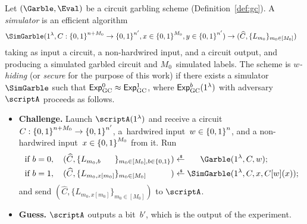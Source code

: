 \begin{definition}\label{def:gc-security}
Let $(\Garble,\Eval)$ be a circuit garbling scheme (Definition~\ref{def:gc}).
A \emph{simulator} is an efficient algorithm
\begin{align*}
\SimGarble&(1^\lambda,C:\bit^{n+M_0}\to\bit^{n'},x\in\bit^{M_0},y\in\bit^{n'})
\WideNarrow{\to}{\\{}\to{}&}
(\widehat{C},\{L_{m_0}\}_{m_0\in[M_0]})
\end{align*}
taking as input a circuit, a non-hardwired input, and a circuit output,
and producing a simulated garbled circuit and $M_0$~simulated labels.
The scheme is \emph{$w$-hiding} (or \emph{secure} for the purpose of this work) if there exists a simulator $\SimGarble$ such that ${\ExpGC{0}\approx\ExpGC{1}}$, where $\ExpGC{b}(1^\lambda)$ with adversary~$\scriptA$ proceeds as follows.
\begin{itemize}\upshape
\item\textbf{Challenge.}
Launch $\scriptA(1^\lambda)$ and receive
a circuit ${C:{\{0,1\}}^{n+M_0}\to{\{0,1\}}^{n'}}$,
a~hardwired input~${w\in{\{0,1\}}^n}$, and
a non-hardwired input~${x\in{\{0,1\}}^{M_0}}$
from it.
Run
\begin{align*}
\textup{if }b=0,\quad
(\widehat{C},\{L_{m_0,\mathrlap{b}\phantom{x[m_0]}}\}_{m_0\in[M_0],b\in\bit})
&{}\draws\phantom{\SimGarble}\mathllap{\Garble}(1^\lambda,C,w);\\
\textup{if }b=1,\quad
(\widehat{C},\{L_{m_0,x[m_0]}\}_{m_0\in[M_0]\phantom{,b\in\bit}})
&{}\draws\SimGarble(1^\lambda,C,x,C[w](x));
\end{align*}
and send $(\widehat{C},\{L_{m_0,x[m_0]}\}_{m_0\in[M_0]})$ to $\scriptA$.
\item\textbf{Guess.}
$\scriptA$ outputs a bit~$b'$, which is the output of the experiment.
\end{itemize}
\end{definition}
